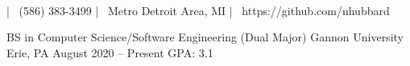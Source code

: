 \documentclass[]{awesome-cv}
\begin{document}
    
\begin{center}
	  \\
	\vspace{2mm}
	 | {\faMobile\ (586) 383-3499} | {\faMapMarker\ Metro Detroit Area, MI} | {\faLink\ https://github.com/nhubbard}
\end{center}
\begin{cventries}
	\cventry
	{BS in Computer Science/Software Engineering (Dual Major)}
	{Gannon University}
	{Erie, PA}
	{August 2020 – Present}
	{GPA: 3.1}
\end{cventries}
\end{document}
